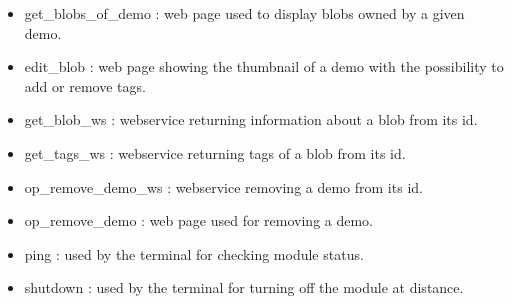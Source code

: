 \begin{itemize}
\item get\_blobs\_of\_demo : web page used to display blobs owned by a given demo.
\item edit\_blob : web page showing the thumbnail of a demo with the possibility to add or remove tags.
\item get\_blob\_ws : webservice returning information about a blob from its id.
\item get\_tags\_ws : webservice returning tags of a blob from its id.
\item op\_remove\_demo\_ws : webservice removing a demo from its id.
\item op\_remove\_demo : web page used for removing a demo.
\item ping : used by the terminal for checking module status.
\item shutdown : used by the terminal for turning off the module at distance.
  
\end{itemize}
